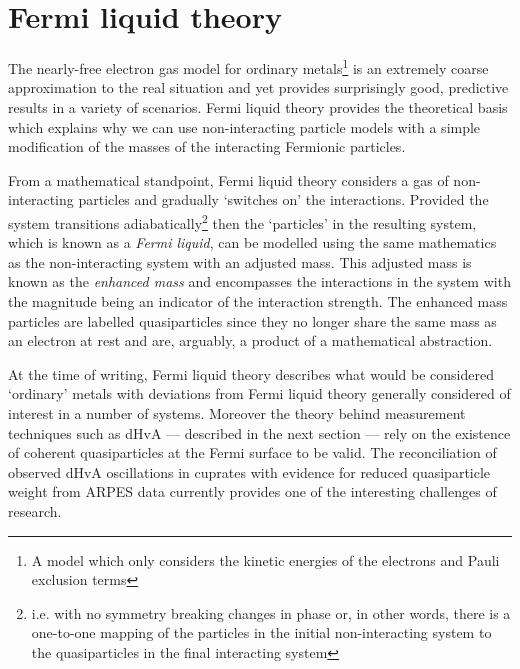 

\section{Fermi liquid theory}

The nearly-free electron gas model for ordinary metals\footnote{A model which only considers the kinetic energies of the electrons and Pauli exclusion terms} is an extremely coarse approximation to the real situation and yet provides surprisingly good, predictive results in a variety of scenarios. Fermi liquid theory provides the theoretical basis which explains why we can use non-interacting particle models with a simple modification of the masses of the interacting Fermionic particles.

From a mathematical standpoint, Fermi liquid theory considers a gas of non-interacting particles and gradually `switches on' the interactions. Provided the system transitions adiabatically\footnote{i.e. with no symmetry breaking changes in phase or, in other words, there is a one-to-one mapping of the particles in the initial non-interacting system to the quasiparticles in the final interacting system} then the `particles' in the resulting system, which is known as a \emph{Fermi liquid}, can be modelled using the same mathematics as the non-interacting system with an adjusted mass. This adjusted mass is known as the \emph{enhanced mass} and encompasses the interactions in the system with the magnitude being an indicator of the interaction strength. The enhanced mass particles are labelled quasiparticles since they no longer share the same mass as an electron at rest and are, arguably, a product of a mathematical abstraction.

At the time of writing, Fermi liquid theory describes what would be considered `ordinary' metals with deviations from Fermi liquid theory generally considered of interest in a number of systems. Moreover the theory behind measurement techniques such as \ac{dHvA} --- described in the next section --- rely on the existence of coherent quasiparticles at the Fermi surface to be valid. The reconciliation of observed \ac{dHvA} oscillations in cuprates with evidence for reduced quasiparticle weight from \ac{ARPES} data currently provides one of the interesting challenges of \highTc research.
